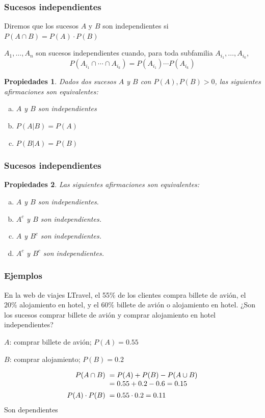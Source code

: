 \documentclass[handout]{beamer}\usepackage[]{graphicx}\usepackage[]{color}
\renewcommand{\emph}[1]{{\color{red}#1}}
\theoremstyle{plain}
\newtheorem{prop}{Propiedades}
\theoremstyle{definition}
\begin{document}
\begin{frame}
\frametitle{Sucesos independientes}

Diremos que  los sucesos $A$ y  $B$ son \emph{independientes} si  $P(A\cap B)=P(A)\cdot P(B)$
\medskip

$A_1,\ldots, A_n$ son sucesos \emph{independientes} cuando, para  toda
subfamilia $A_{i_1},\ldots,A_{i_k}$,
$$
P(A_{i_1}\cap \cdots\cap A_{i_k})=P(A_{i_1})\cdots P(A_{i_k})
$$

\begin{prop}
Dados dos sucesos  $A$ y $B$ con  $P(A),P(B)>0$,  las siguientes afirmaciones son equivalentes:
\begin{enumerate}[(a)]
\item $A$ y $B$ son independientes 

\item $P(A|B)=P(A)$

\item $P(B|A)=P(B)$
\end{enumerate}
\end{prop}
\end{frame}


\begin{frame}
\frametitle{Sucesos independientes}

\begin{prop}
Las siguientes afirmaciones son equivalentes:
\begin{enumerate}[a)]
\item $A$ y $B$ son independientes.
\item $A^c$ y $B$ son independientes.
\item $A$ y $B^c$ son independientes.
\item $A^c$ y $B^c$ son independientes.
\end{enumerate}
\end{prop}
\end{frame}


\begin{frame}
\frametitle{Ejemplos}
En la web de viajes LTravel, el 55\% de los clientes compra billete de avión, el $20\%$  alojamiento en hotel, y el $60\%$  billete de avión  o alojamiento en hotel. ¿Son los sucesos comprar billete de avión y  comprar alojamiento en hotel independientes?
\medskip

$A$: comprar billete de avión; $P(A)=0.55$
\medskip

$B$: comprar alojamiento; $P(B)=0.2$
\medskip

$$
\begin{array}{rl}
P(A\cap B) & \hspace*{-1ex}=P(A)+P(B)-P(A\cup B)\\ & \hspace*{-1ex}=0.55+0.2-0.6=0.15\\[1ex]
P(A)\cdot P(B) &  \hspace*{-1ex}= 0.55\cdot 0.2=0.11
\end{array}
$$
Son dependientes


\end{frame}
\end{document}
